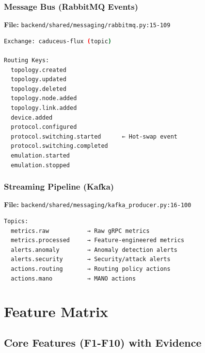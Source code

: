 \documentclass[10pt,a4paper]{article}
\begin{document}
\subsubsection{Message Bus (RabbitMQ Events)}

\textbf{File:} \texttt{backend/shared/messaging/rabbitmq.py:15-109}

\begin{lstlisting}[language=bash]
Exchange: caduceus-flux (topic)

Routing Keys:
  topology.created
  topology.updated
  topology.deleted
  topology.node.added
  topology.link.added
  device.added
  protocol.configured
  protocol.switching.started      ← Hot-swap event
  protocol.switching.completed
  emulation.started
  emulation.stopped
\end{lstlisting}

\subsubsection{Streaming Pipeline (Kafka)}

\textbf{File:} \texttt{backend/shared/messaging/kafka\_producer.py:16-100}

\begin{lstlisting}[language=bash]
Topics:
  metrics.raw           → Raw gRPC metrics
  metrics.processed     → Feature-engineered metrics
  alerts.anomaly        → Anomaly detection alerts
  alerts.security       → Security/attack alerts
  actions.routing       → Routing policy actions
  actions.mano          → MANO actions
\end{lstlisting}

\section{Feature Matrix}

\subsection{Core Features (F1-F10) with Evidence}
\end{document}
